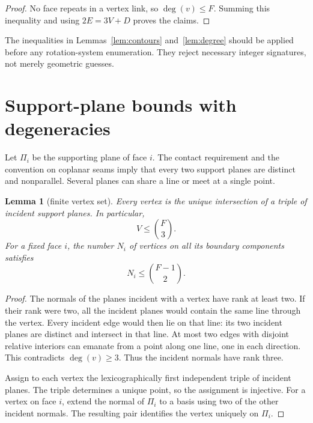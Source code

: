 \documentclass[11pt,a4paper]{article}
\newtheorem{lemma}[theorem]{Lemma}
\theoremstyle{definition}
\newcommand{\binomFthree}{\binom{F}{3}}
\begin{document}
\begin{proof}
No face repeats in a vertex link, so $\deg(v)\leq F$.  Summing this
inequality and using $2E=3V+D$ proves the claims.
\end{proof}

The inequalities in Lemmas~\ref{lem:contours} and~\ref{lem:degree} should be
applied before any rotation-system enumeration.  They reject necessary
integer signatures, not merely geometric guesses.

\section{Support-plane bounds with degeneracies}\label{sec:planes}

Let $\Pi_i$ be the supporting plane of face $i$. The contact requirement and
the convention on coplanar seams imply that every two support planes are
distinct and nonparallel. Several planes can share a line or meet at a
single point.

\begin{lemma}[finite vertex set]\label{lem:vertices}
Every vertex is the unique intersection of a triple of incident support
planes. In particular,
\begin{equation}\label{eq:Varr}
  V\leq\binomFthree.
\end{equation}
For a fixed face $i$, the number $N_i$ of vertices on all its boundary
components satisfies
\begin{equation}\label{eq:Niface}
  N_i\leq\binom{F-1}{2}.
\end{equation}
\end{lemma}

\begin{proof}
The normals of the planes incident with a vertex have rank at least two.
If their rank were two, all the incident planes would contain the same
line through the vertex. Every incident edge would then lie on that line:
its two incident planes are distinct and intersect in that line. At most two
edges with disjoint relative interiors can emanate from a point along one
line, one in each direction. This contradicts $\deg(v)\geq3$. Thus the
incident normals have rank three.

Assign to each vertex the lexicographically first independent triple of
incident planes. The triple determines a unique point, so the assignment
is injective. For a vertex on face $i$, extend the normal of $\Pi_i$ to a
basis using two of the other incident normals. The resulting pair identifies
the vertex uniquely on $\Pi_i$.
\end{proof}
\end{document}
